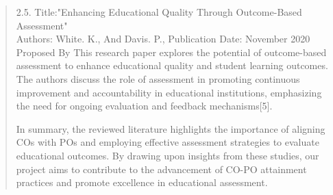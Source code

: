 \documentclass[12pt]{report}
\begin{document}
\begin{quote}
		2.5. Title:"Enhancing Educational Quality Through Outcome-Based Assessment"
		\\
		Authors: White. K., And Davis. P.,
		Publication Date: November 2020 Proposed By
		This research paper explores the potential of outcome-based assessment to enhance educational quality and student learning outcomes. The authors discuss the role of assessment in promoting continuous improvement and accountability in educational institutions, emphasizing the need for ongoing evaluation and feedback mechanisms[5].
		
		In summary, the reviewed literature highlights the importance of aligning COs with POs and employing effective assessment strategies to evaluate educational outcomes. By drawing upon insights from these studies, our project aims to contribute to the advancement of CO-PO attainment practices and promote excellence in educational assessment.
	\end{quote}
	\clearpage
	
\end{document}

